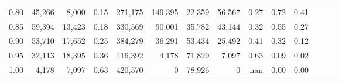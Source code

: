 \begin{tabular}{rrrrrrrrrrrrrr}
0.80 &  45,266 &   8,000 &  0.15 &  271,175 &  149,395 &  22,359 &  56,567 &  0.27 &  0.72 &      0.41 \\
0.85 &  59,394 &  13,423 &  0.18 &  330,569 &   90,001 &  35,782 &  43,144 &  0.32 &  0.55 &      0.27 \\
0.90 &  53,710 &  17,652 &  0.25 &  384,279 &   36,291 &  53,434 &  25,492 &  0.41 &  0.32 &      0.12 \\
0.95 &  32,113 &  18,395 &  0.36 &  416,392 &    4,178 &  71,829 &   7,097 &  0.63 &  0.09 &      0.02 \\
1.00 &   4,178 &   7,097 &  0.63 &  420,570 &        0 &  78,926 &       0 &   nan &  0.00 &      0.00 \\
\bottomrule
\end{tabular}
